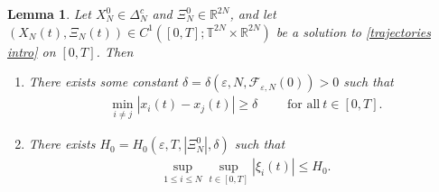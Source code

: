 \documentclass[11pt,reqno]{amsart}
\newtheorem{lem}[thm]{Lemma}
\numberwithin{equation}{section}
\begin{document}
\begin{lem}\label{lemma:6.2}
Let $X_{N}^{0}\in  \Delta_{N}^{c}$ and $\Xi_{N}^{0}\in \mathbb{R}^{2N}$, 
and let $(X_{N}(t),\Xi_{N}(t))\in C^{1}([0,T];\mathbb{T}^{2N}\times \mathbb{R}^{2N})$ 
be a solution to \eqref{trajectories intro} on $[0,T]$. Then
\begin{enumerate}
\item[{\rm(i)}] There exists  some constant  
$\delta=\delta(\varepsilon,N,\mathcal{F}_{\varepsilon,N}(0))>0$ such that 
\begin{align}
\min_{i\neq j}\left\vert x_{i}(t)-x_{j}(t)\right\vert\geq \delta 
\qquad\mbox{\ for all} \ t\in [0,T].  \label{bound from below on separation}    
\end{align}
\item[{\rm(ii)}] There exists 
$H_{0}=H_{0}(\varepsilon,T,\left\vert \Xi_{N}^{0}\right\vert,\delta )$ such that
\begin{align}
\underset{1\leq i\leq N}{\sup}\underset{t\in [0,T]}{\sup}\left\vert \xi_{i}(t)\right\vert\leq H_{0}. \label{H0 est} 
\end{align}
\end{enumerate}
\end{lem}
\end{document}
